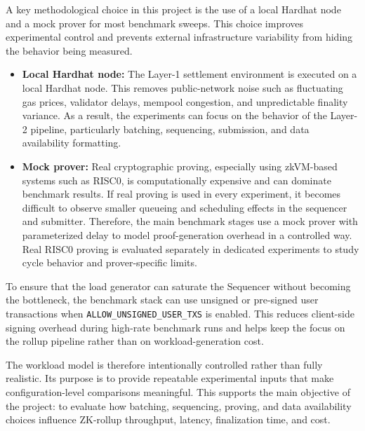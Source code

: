 A key methodological choice in this project is the use of a local Hardhat node and a mock prover for most benchmark sweeps. This choice improves experimental control and prevents external infrastructure variability from hiding the behavior being measured.

\begin{itemize}
    \item \textbf{Local Hardhat node:} 
    The Layer-1 settlement environment is executed on a local Hardhat node. This removes public-network noise such as fluctuating gas prices, validator delays, mempool congestion, and unpredictable finality variance. As a result, the experiments can focus on the behavior of the Layer-2 pipeline, particularly batching, sequencing, submission, and data availability formatting.

    \item \textbf{Mock prover:} 
    Real cryptographic proving, especially using zkVM-based systems such as RISC0, is computationally expensive and can dominate benchmark results. If real proving is used in every experiment, it becomes difficult to observe smaller queueing and scheduling effects in the sequencer and submitter. Therefore, the main benchmark stages use a mock prover with parameterized delay to model proof-generation overhead in a controlled way. Real RISC0 proving is evaluated separately in dedicated experiments to study cycle behavior and prover-specific limits.
\end{itemize}

To ensure that the load generator can saturate the Sequencer without becoming the bottleneck, the benchmark stack can use unsigned or pre-signed user transactions when \texttt{ALLOW\_UNSIGNED\_USER\_TXS} is enabled. This reduces client-side signing overhead during high-rate benchmark runs and helps keep the focus on the rollup pipeline rather than on workload-generation cost.

The workload model is therefore intentionally controlled rather than fully realistic. Its purpose is to provide repeatable experimental inputs that make configuration-level comparisons meaningful. This supports the main objective of the project: to evaluate how batching, sequencing, proving, and data availability choices influence ZK-rollup throughput, latency, finalization time, and cost.
